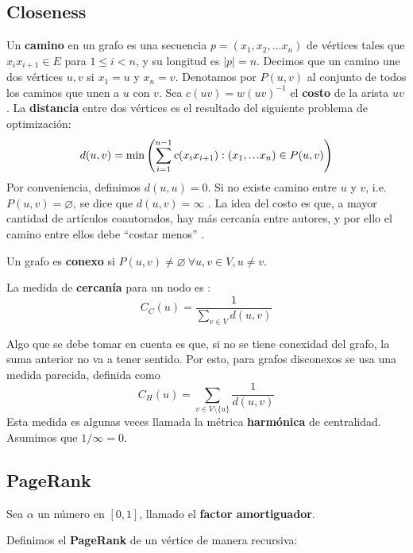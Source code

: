 \documentclass[journal]{IEEEtran}
\newcommand\mydots{\hbox to 1em{.\hss.\hss.}}
\begin{document}
\subsection{Closeness}
Un \textbf{camino} en un grafo es una secuencia \(p = (x_1, x_2, \ldots x_n)\) de vértices tales que \(x_{i}x_{i+1} \in E\) para \(1 \leq i < n\), y su longitud es \(|p| = n\). Decimos que un camino une dos vértices \(u, v\) si \(x_1 = u\) y \(x_n = v\). Denotamos por \(P(u, v)\) al conjunto de todos los caminos que unen a \(u\) con \(v\). Sea \(c(uv) = w(uv)^{-1}\) el \textbf{costo} de la arista \(uv\). La \textbf{distancia} entre dos vértices es el resultado del siguiente problema de optimización:
\begin{equation} \label{eq:distance}
d(u, v) = \min \left(\sum_{i=1}^{n-1} c(x_{i}x_{i+1}) : (x_1, \mydots x_n) \in P(u, v)\right)
\end{equation}
Por conveniencia, definimos \(d(u, u) = 0\). Si no existe camino entre \(u\) y \(v\), i.e. \(P(u, v) = \varnothing\), se dice que \(d(u, v) = \infty\) \cite{bollobas}. La idea del costo es que, a mayor cantidad de artículos coautorados, hay más cercanía entre autores, y por ello el camino entre ellos debe ``costar menos'' \cite{newman}.

Un grafo es \textbf{conexo} si \(P(u, v) \neq \varnothing~\forall u, v \in V, u \neq v\).

La medida de \textbf{cercanía} para un nodo es \cite{brandes}:
\begin{equation} \label{eq:close}
C_C (u) = \frac{1}{\sum_{v \in V} d(u, v)}
\end{equation}

Algo que se debe tomar en cuenta es que, si no se tiene conexidad del grafo, la suma anterior no va a tener sentido. Por esto, para grafos disconexos se usa una medida parecida, definida como
\begin{equation}
C_H (u) = \sum_{v \in V \setminus \{u\}} \frac{1}{d(u, v)}
\end{equation}
Esta medida es algunas veces llamada la métrica \textbf{harmónica} de centralidad\cite{rochat}. Asumimos que \(1/\infty = 0\).
\subsection{PageRank}
Sea \(\alpha\) un número en \([0, 1]\), llamado el \textbf{factor amortiguador}.

Definimos el \textbf{PageRank} de un vértice de manera recursiva:
\end{document}
